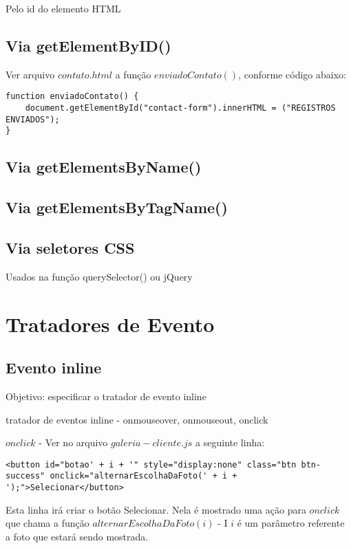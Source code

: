  Pelo id do elemento HTML
 
\subsection{Via getElementByID()}
	Ver arquivo $contato.html$ a função $enviadoContato()$, conforme código abaixo:
	
\begin{lstlisting}
function enviadoContato() {
    document.getElementById("contact-form").innerHTML = ("REGISTROS ENVIADOS");
}
\end{lstlisting}

\subsection{Via getElementsByName()}



\subsection{Via getElementsByTagName()}



\subsection{Via seletores CSS}
  Usados na função querySelector() ou jQuery
  
\section{Tratadores de Evento}
\subsection{Evento inline}
Objetivo: especificar o tratador de evento inline

tratador de eventos inline - onmouseover, onmouseout, onclick

$onclick$ - Ver no arquivo $galeria-cliente.js$ a seguinte linha:

\begin{lstlisting}
<button id="botao' + i + '" style="display:none" class="btn btn-success" onclick="alternarEscolhaDaFoto(' + i + ');">Selecionar</button>
\end{lstlisting}

	Esta linha irá criar o botão Selecionar. Nela é mostrado uma ação para $onclick$ que chama a função $alternarEscolhaDaFoto(i)$ - I $i$ é um parâmetro referente a foto que estará sendo mostrada.

